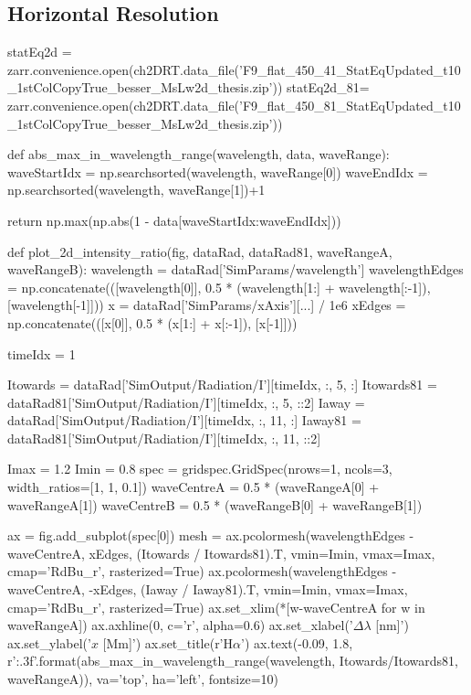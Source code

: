 \subsection{Horizontal Resolution}\label{Sec:HorizontalResolution}

\begin{pycode}[2DRT]
statEq2d = zarr.convenience.open(ch2DRT.data_file('F9_flat_450_41_StatEqUpdated_t10_1stColCopyTrue_besser_MsLw2d_thesis.zip'))
statEq2d_81= zarr.convenience.open(ch2DRT.data_file('F9_flat_450_81_StatEqUpdated_t10_1stColCopyTrue_besser_MsLw2d_thesis.zip'))

def abs_max_in_wavelength_range(wavelength, data, waveRange):
    waveStartIdx = np.searchsorted(wavelength, waveRange[0])
    waveEndIdx = np.searchsorted(wavelength, waveRange[1])+1

    return np.max(np.abs(1 - data[waveStartIdx:waveEndIdx]))


def plot_2d_intensity_ratio(fig, dataRad, dataRad81, waveRangeA, waveRangeB):
    wavelength = dataRad['SimParams/wavelength']
    wavelengthEdges = np.concatenate(([wavelength[0]], 0.5 * (wavelength[1:] + wavelength[:-1]), [wavelength[-1]]))
    x = dataRad['SimParams/xAxis'][...] / 1e6
    xEdges = np.concatenate(([x[0]], 0.5 * (x[1:] + x[:-1]), [x[-1]]))

    timeIdx = 1

    Itowards = dataRad['SimOutput/Radiation/I'][timeIdx, :, 5, :]
    Itowards81 = dataRad81['SimOutput/Radiation/I'][timeIdx, :, 5, ::2]
    Iaway = dataRad['SimOutput/Radiation/I'][timeIdx, :, 11, :]
    Iaway81 = dataRad81['SimOutput/Radiation/I'][timeIdx, :, 11, ::2]

    Imax = 1.2
    Imin = 0.8
    spec = gridspec.GridSpec(nrows=1, ncols=3, width_ratios=[1, 1, 0.1])
    waveCentreA = 0.5 * (waveRangeA[0] + waveRangeA[1])
    waveCentreB = 0.5 * (waveRangeB[0] + waveRangeB[1])

    ax = fig.add_subplot(spec[0])
    mesh = ax.pcolormesh(wavelengthEdges - waveCentreA, xEdges, (Itowards / Itowards81).T, vmin=Imin, vmax=Imax, cmap='RdBu_r', rasterized=True)
    ax.pcolormesh(wavelengthEdges - waveCentreA, -xEdges, (Iaway / Iaway81).T, vmin=Imin, vmax=Imax, cmap='RdBu_r', rasterized=True)
    ax.set_xlim(*[w-waveCentreA for w in waveRangeA])
    ax.axhline(0, c='r', alpha=0.6)
    ax.set_xlabel('$\Delta\lambda$ [nm]')
    ax.set_ylabel('$x$ [Mm]')
    ax.set_title(r'H$\alpha$')
    ax.text(-0.09, 1.8, r'{:.3f}'.format(abs_max_in_wavelength_range(wavelength,
                                          Itowards/Itowards81, waveRangeA)),
            va='top', ha='left', fontsize=10)


\end{pycode}
